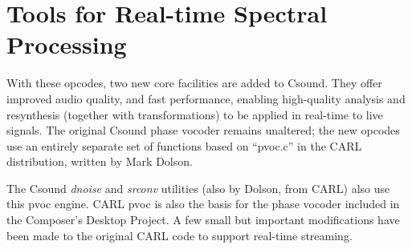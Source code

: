 \begin{comment}
\documentclass[10pt]{article}
\usepackage{fullpage, graphicx, url}
\setlength{\parskip}{1ex}
\setlength{\parindent}{0ex}
\title{Tools for Real-time Spectral Processing}



\begin{tabular}{ccc}
The Alternative Csound Reference Manual & & \\
Previous &Spectral Processing &Next

\end{tabular}

\end{comment}
\section{Tools for Real-time Spectral Processing}


  With these opcodes, two new core facilities are added to Csound. They offer improved audio quality, and fast performance, enabling high-quality analysis and resynthesis (together with transformations) to be applied in real-time to live signals. The original Csound phase vocoder remains unaltered; the new opcodes use an entirely separate set of functions based on ``pvoc.c'' in the CARL distribution, written by Mark Dolson. 


  The Csound \emph{dnoise}
 and \emph{srconv}
 utilities (also by Dolson, from CARL) also use this pvoc engine. CARL pvoc is also the basis for the phase vocoder included in the Composer's Desktop Project. A few small but important modifications have been made to the original CARL code to support real-time streaming. 


 


